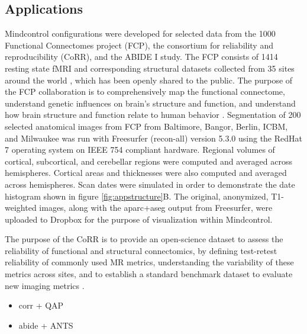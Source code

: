 \subsection{Applications}

Mindcontrol configurations were developed for selected data from the 1000 Functional Connectomes project (FCP), the consortium for reliability and reproducibility (CoRR), and the ABIDE I study. The FCP consists of 1414 resting state fMRI and corresponding structural datasets collected from 35 sites around the world  \cite{biswal2010toward}, which has been openly shared to the public. The purpose of the FCP collaboration is to comprehensively map the functional connectome, understand genetic influences on brain's structure and function, and understand how brain structure and function relate to human behavior \cite{biswal2010toward}. Segmentation of 200 selected anatomical images from FCP from Baltimore, Bangor, Berlin, ICBM, and Milwaukee was run with Freesurfer (recon-all) version 5.3.0 \cite{fischl2002whole} using the RedHat 7 operating system on IEEE 754 compliant hardware. Regional volumes of cortical, subcortical, and cerebellar regions were computed and averaged across hemispheres. Cortical areas and thicknesses were also computed and averaged across hemispheres. Scan dates were simulated in order to demonstrate the date histogram shown in figure \ref{fig:appstructure}B. The original, anonymized, T1-weighted images, along with the aparc+aseg output from Freesurfer, were uploaded to Dropbox for the purpose of visualization within Mindcontrol.

The purpose of the CoRR is to provide an open-science dataset to assess the reliability of functional and structural connectomics, by defining test-retest reliability of commonly used MR metrics, understanding the variability of these metrics across sites, and to establish a standard benchmark dataset to evaluate new imaging metrics \cite{Zuo_2014}. 


\begin{itemize}
\item corr + QAP
\item abide + ANTS
\end{itemize}